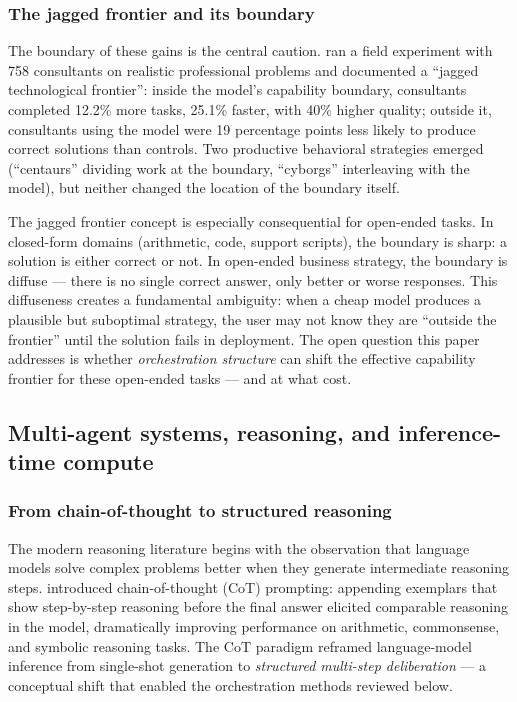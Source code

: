 \documentclass[12pt,a4paper]{article}
\begin{document}
\subsubsection{The jagged frontier and its boundary}

The boundary of these gains is the central caution. \citet{DellAcquaEtAl2023}
ran a field experiment with 758 consultants on realistic professional problems
and documented a ``jagged technological frontier'': inside the model's
capability boundary, consultants completed 12.2\% more tasks, 25.1\% faster,
with 40\% higher quality; outside it, consultants using the model were 19
percentage points less likely to produce correct solutions than controls. Two
productive behavioral strategies emerged (``centaurs'' dividing work at the
boundary, ``cyborgs'' interleaving with the model), but neither changed the
location of the boundary itself.

The jagged frontier concept is especially consequential for open-ended tasks.
In closed-form domains (arithmetic, code, support scripts), the boundary is
sharp: a solution is either correct or not. In open-ended business strategy,
the boundary is diffuse --- there is no single correct answer, only better or
worse responses. This diffuseness creates a fundamental ambiguity: when a cheap
model produces a plausible but suboptimal strategy, the user may not know they
are ``outside the frontier'' until the solution fails in deployment. The open
question this paper addresses is whether \emph{orchestration structure} can
shift the effective capability frontier for these open-ended tasks --- and at
what cost.

\subsection{Multi-agent systems, reasoning, and inference-time compute}

\subsubsection{From chain-of-thought to structured reasoning}

The modern reasoning literature begins with the observation that language models
solve complex problems better when they generate intermediate reasoning steps.
\citet{WeiEtAl2022} introduced chain-of-thought (CoT) prompting: appending
exemplars that show step-by-step reasoning before the final answer elicited
comparable reasoning in the model, dramatically improving performance on
arithmetic, commonsense, and symbolic reasoning tasks. The CoT paradigm
reframed language-model inference from single-shot generation to
\emph{structured multi-step deliberation} --- a conceptual shift that enabled
the orchestration methods reviewed below.
\end{document}
